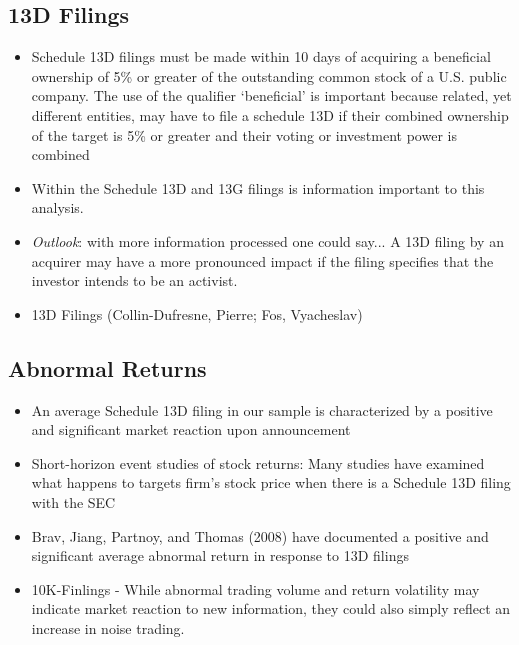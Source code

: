 \documentclass[12pt]{article}
\begin{document}
\subsection{13D Filings}

    \begin{itemize}
        \item Schedule 13D filings must be made within 10 days of acquiring a beneficial ownership of 5\% or greater of the outstanding common stock of a U.S. public company. The use of the qualifier ‘beneficial’ is important because related, yet different entities, may have to file a schedule 13D if their combined ownership of the target is 5\% or greater and their voting or investment power is combined \citep{Brigida2012}

        \item Within the Schedule 13D and 13G filings is information important to this analysis. \citep{Brigida2012}

        \item \emph{Outlook}: with more information processed one could say... A 13D filing by an acquirer may have a more pronounced impact if the filing specifies that the investor intends to be an activist. \citep{Brigida2012}

        \item 13D Filings (Collin-Dufresne, Pierre; Fos, Vyacheslav)
        
    \end{itemize}

\subsection{Abnormal Returns}
    \begin{itemize}
        \item An average Schedule 13D filing in our sample is characterized by a positive and significant market reaction upon announcement \citep{Collin-Dufresne2015}

        \item Short-horizon event studies of stock returns: Many studies have examined what happens to targets firm’s stock price when there is a Schedule 13D filing with the SEC \citep{CoffeeJr.2014}

        \item Brav, Jiang, Partnoy, and Thomas (2008) have documented a positive and significant average abnormal return in response to 13D filings \citep{Brigida2012}

        \item 10K-Finlings - While abnormal trading volume and return volatility may indicate market reaction to new information, they could also simply reflect an increase in noise trading. \citep{You2009}

    \end{itemize}
\end{document}
